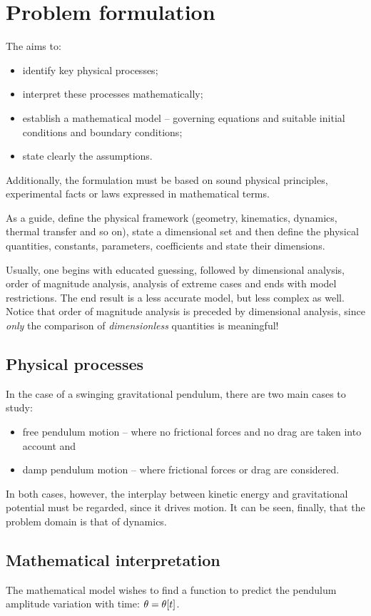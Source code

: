 \section{Problem formulation}
The  aims to:
\begin{itemize}
\item identify key physical processes;
\item interpret these processes mathematically;
\item establish a mathematical model -- governing equations and suitable initial conditions and boundary conditions;
\item state clearly the assumptions.
\end{itemize}

Additionally, the formulation must be based on sound physical principles, experimental facts or laws expressed in mathematical terms. 

As a guide, define the physical framework (geometry, kinematics, dynamics, thermal transfer and so on), state a dimensional set and then define the physical quantities, constants, parameters, coefficients and state their dimensions.

Usually, one begins with educated guessing, followed by dimensional analysis, order of magnitude analysis, analysis of extreme cases and ends with model restrictions. The end result is a less accurate model, but less complex as well. Notice that order of magnitude analysis is preceded by dimensional analysis, since \emph{only} the comparison of \emph{dimensionless} quantities is meaningful!


\subsection{Physical processes}
In the case of a swinging gravitational pendulum, there are two main cases to study:
\begin{itemize}
\item free pendulum motion -- where no frictional forces and no drag are taken into account and
\item damp pendulum motion -- where frictional forces or drag are considered.
\end{itemize}
In both cases, however, the interplay between kinetic energy and gravitational potential must be regarded, since it drives motion. It can be seen, finally, that the problem domain is that of dynamics.


\subsection{Mathematical interpretation}
The mathematical model wishes to find a function to predict the pendulum amplitude variation with time: $\theta = \theta\!\left[{t}\right]$.

